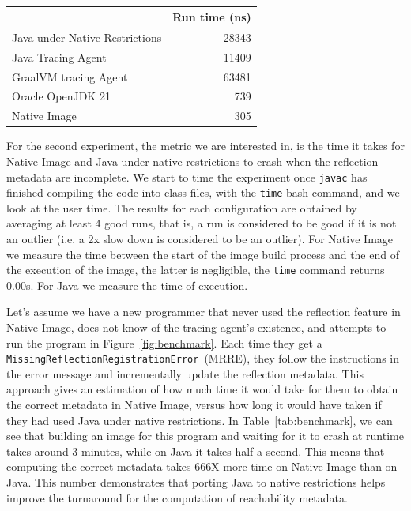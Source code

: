 \begin{table}[ht]
\centering
\begin{tabular}{@{}lr@{}}
\toprule
                               & \multicolumn{1}{l}{Run time (ns)} \\ \midrule
Java under Native Restrictions & 28343                             \\
Java Tracing Agent             & 11409                             \\
GraalVM tracing Agent          & 63481                             \\
Oracle OpenJDK 21              & 739                               \\
Native Image                   & 305                               \\ \bottomrule
\end{tabular}
\caption{}
\label{tab:benchmark_1}
\end{table}
For the second experiment, the metric we are interested in, is the time it takes for Native Image and Java under native restrictions to crash when the reflection metadata are incomplete. 
We start to time the experiment once \verb|javac| has finished compiling the code into class files, with the \verb|time| bash command, and we look at the user time. 
The results for each configuration are obtained by averaging at least 4 good runs, that is, a run is considered to be good if it is not an outlier (i.e. a 2x slow down is considered to be an outlier).
For Native Image we measure the time between the start of the image build process and the end of the execution of the image, the latter is negligible, the \verb|time| command returns 0.00s. For Java we measure the time of execution.

Let's assume we have a new programmer that never used the reflection feature in Native Image, does not know of the tracing agent's existence, and attempts to run the program in Figure~\ref{fig:benchmark}. Each time they get a \verb|MissingReflectionRegistrationError|~(MRRE), they follow the instructions in the error message and incrementally update the reflection metadata.
This approach gives an estimation of how much time it would take for them to obtain the correct metadata in Native Image, versus how long it would have taken if they had used Java under native restrictions. 
In Table~\ref{tab:benchmark}, we can see that building an image for this program and waiting for it to crash at runtime takes around 3 minutes, while on Java it takes half a second. This means that computing the correct metadata takes 666X more time on Native Image than on Java.
This number demonstrates that porting Java to native restrictions helps improve the turnaround for the computation of reachability metadata.

